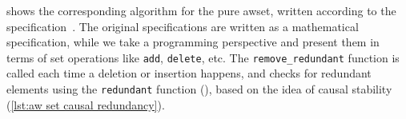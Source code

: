  shows the corresponding algorithm for the pure \acrshort{awset},
written according to the specification~\cite{baquero2017PureOp,baquero2014PureOp}.
The original specifications
are written as a mathematical specification, while we take
a programming perspective and present them in terms of set operations like
\texttt{add}, \texttt{delete}, etc. The \verb|remove_redundant| function is called
each time a deletion or insertion happens, and checks
for redundant elements using the \verb|redundant| 
function (), based on the 
idea of causal stability (\cref{lst:aw set causal redundancy}).






